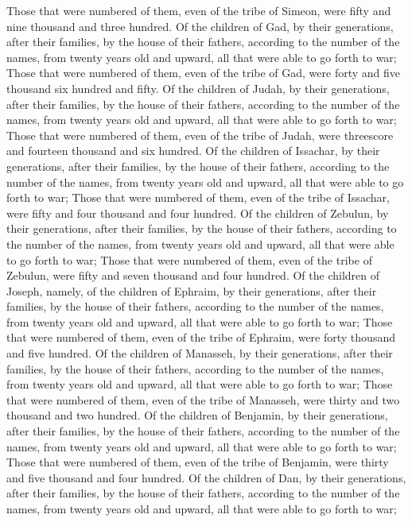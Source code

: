 \begin{biblechapter}
\verse Those that were numbered of them, even of the tribe of Simeon, were fifty and nine thousand and three hundred.
\verse Of the children of Gad, by their generations, after their families, by the house of their fathers, according to the number of the names, from twenty years old and upward, all that were able to go forth to war;
\verse Those that were numbered of them, even of the tribe of Gad, were forty and five thousand six hundred and fifty.
\verse Of the children of Judah, by their generations, after their families, by the house of their fathers, according to the number of the names, from twenty years old and upward, all that were able to go forth to war;
\verse Those that were numbered of them, even of the tribe of Judah, were threescore and fourteen thousand and six hundred.
\verse Of the children of Issachar, by their generations, after their families, by the house of their fathers, according to the number of the names, from twenty years old and upward, all that were able to go forth to war;
\verse Those that were numbered of them, even of the tribe of Issachar, were fifty and four thousand and four hundred.
\verse Of the children of Zebulun, by their generations, after their families, by the house of their fathers, according to the number of the names, from twenty years old and upward, all that were able to go forth to war;
\verse Those that were numbered of them, even of the tribe of Zebulun, were fifty and seven thousand and four hundred.
\verse Of the children of Joseph, namely, of the children of Ephraim, by their generations, after their families, by the house of their fathers, according to the number of the names, from twenty years old and upward, all that were able to go forth to war;
\verse Those that were numbered of them, even of the tribe of Ephraim, were forty thousand and five hundred.
\verse Of the children of Manasseh, by their generations, after their families, by the house of their fathers, according to the number of the names, from twenty years old and upward, all that were able to go forth to war;
\verse Those that were numbered of them, even of the tribe of Manasseh, were thirty and two thousand and two hundred.
\verse Of the children of Benjamin, by their generations, after their families, by the house of their fathers, according to the number of the names, from twenty years old and upward, all that were able to go forth to war;
\verse Those that were numbered of them, even of the tribe of Benjamin, were thirty and five thousand and four hundred.
\verse Of the children of Dan, by their generations, after their families, by the house of their fathers, according to the number of the names, from twenty years old and upward, all that were able to go forth to war;

\end{biblechapter}
